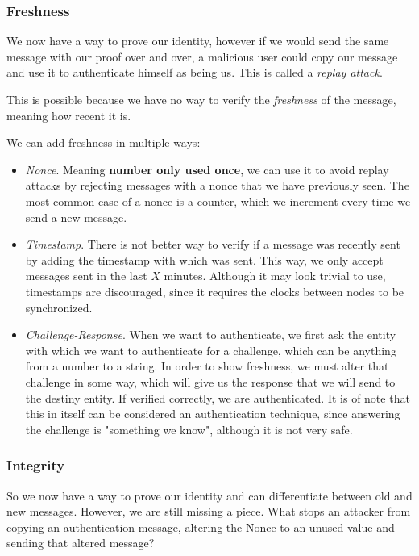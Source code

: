 \documentclass[12pt,a4paper]{article}
\theoremstyle{definition}
\begin{document}
\subsubsection{Freshness}

We now have a way to prove our identity, however if we would send the same message with our proof over and over, a malicious user could copy our message and use it to authenticate himself as being us. This is called a \emph{replay attack}.

This is possible because we have no way to verify the \emph{freshness} of the message, meaning how recent it is.

We can add freshness in multiple ways:

\begin{itemize}
    \item \emph{Nonce}. Meaning \textbf{number only used once}, we can use it to avoid replay attacks by rejecting messages with a nonce that we have previously seen. The most common case of a nonce is a counter, which we increment every time we send a new message.
    \item \emph{Timestamp}. There is not better way to verify if a message was recently sent by adding the timestamp with which was sent. This way, we only accept messages sent in the last $X$ minutes. Although it may look trivial to use, timestamps are discouraged, since it requires the clocks between nodes to be synchronized.
    \item \emph{Challenge-Response}. When we want to authenticate, we first ask the entity with which we want to authenticate for a challenge, which can be anything from a number to a string. In order to show freshness, we must alter that challenge in some way, which will give us the response that we will send to the destiny entity. If verified correctly, we are authenticated. It is of note that this in itself can be considered an authentication technique, since answering the challenge is "something we know", although it is not very safe.
\end{itemize}

\subsubsection{Integrity}

So we now have a way to prove our identity and can differentiate between old and new messages. However, we are still missing a piece. What stops an attacker from copying an authentication message, altering the Nonce to an unused value and sending that altered message? 
\end{document}
